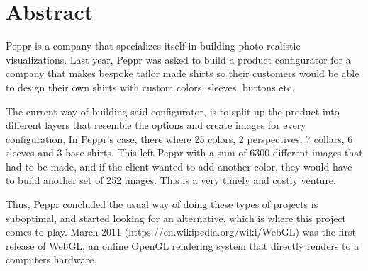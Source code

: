 \newpage
\section{Abstract}

Peppr is a company that specializes itself in building photo-realistic visualizations. Last year, Peppr was asked to build a product configurator for a company that makes bespoke tailor made shirts so their customers would be able to design their own shirts with custom colors, sleeves, buttons etc. 

The current way of building said configurator, is to split up the product into different layers that resemble the options and create images for every configuration. In Peppr's case, there where 25 colors, 2 perspectives, 7 collars, 6 sleeves and 3 base shirts. This left Peppr with a sum of 6300 different images that had to be made, and if the client wanted to add another color, they would have to build another set of 252 images. This is a very timely and costly venture.

Thus, Peppr concluded the usual way of doing these types of projects is suboptimal, and started looking for an alternative, which is where this project comes to play. March 2011 (https://en.wikipedia.org/wiki/WebGL) was the first release of WebGL, an online OpenGL rendering system that directly renders to a computers hardware.
\newpage